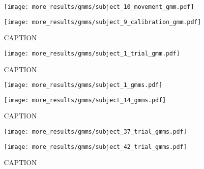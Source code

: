 \documentclass[../main.tex]{subfiles}
\begin{document}
\begin{figure}[H]%
  \centering
  \begin{minipage}{0.49\textwidth}
    \texttt{[image: more\_results/gmms/subject\_10\_movement\_gmm.pdf]}
    \subcaption{}
  \end{minipage}%
  \begin{minipage}{0.49\textwidth}
    \texttt{[image: more\_results/gmms/subject\_9\_calibration\_gmm.pdf]}
    \subcaption{}
  \end{minipage}
  \caption[Example prior GMMs]{CAPTION}\label{fig:example_prior_gmms}
\end{figure}


\begin{figure}[H]%
  \centering
    \texttt{[image: more\_results/gmms/subject\_1\_trial\_gmm.pdf]}
    \caption[Subject 1 trial GMMs overlayed on trajectories]{CAPTION}\label{fig:example_1_trial_data_gmms}
\end{figure}



\begin{figure}[H]%
  \centering
  \begin{minipage}{0.49\textwidth}
    \texttt{[image: more\_results/gmms/subject\_1\_gmms.pdf]}
    \subcaption{}
  \end{minipage}%
  \begin{minipage}{0.49\textwidth}
    \texttt{[image: more\_results/gmms/subject\_14\_gmms.pdf]}
    \subcaption{}
  \end{minipage}
  \caption[Example GMMs for subjects 1 and 14]{CAPTION}\label{fig:example_gmms}
\end{figure}


\begin{figure}[H]%
  \centering
  \begin{minipage}{0.49\textwidth}
    \texttt{[image: more\_results/gmms/subject\_37\_trial\_gmms.pdf]}
    \subcaption{}
  \end{minipage}%
  \begin{minipage}{0.49\textwidth}
    \texttt{[image: more\_results/gmms/subject\_42\_trial\_gmms.pdf]}
    \subcaption{}
  \end{minipage}
  \caption[Example trial GMMs for subjects 37 and 42]{CAPTION}\label{fig:example_trial_gmms}
\end{figure}
\end{document}

